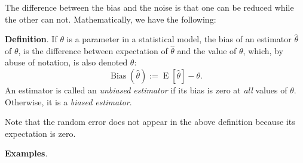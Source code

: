 \documentclass[12pt]{article}
\begin{document}
The difference between the bias and the noise is that one can be reduced while the other can not.  Mathematically, we have the following:

\textbf{Definition}.  If $\theta$ is a parameter in a statistical
model, the bias of an estimator $\hat{\theta}$ of $\theta$, is the
difference between expectation of $\hat{\theta}$ and the value of
$\theta$, which, by abuse of notation, is also denoted $\theta$:
$$\operatorname{Bias}(\hat{\theta}):=\operatorname{E}[\hat{\theta}]-\theta.$$
An estimator is called an \emph{unbiased estimator} if its bias is
zero at \emph{all} values of $\theta$.  Otherwise, it is a
\emph{biased estimator}.

Note that the random error does not appear in the above definition because its expectation is zero.

\textbf{Examples}.
\end{document}
